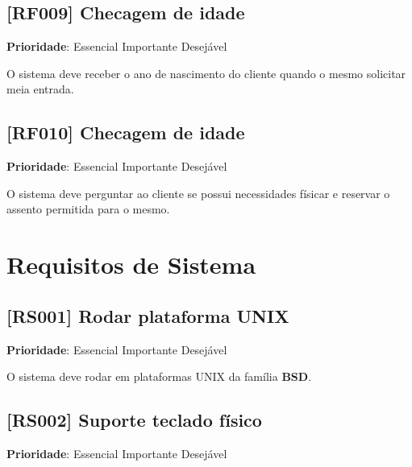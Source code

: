 \documentclass[12pt,a4paper]{article}
\let\oldsection\section
\renewcommand\section{\clearpage\oldsection}
\begin{document}
\subsection{[RF009] Checagem de idade}

\textbf{Prioridade}:
\mbox{\ooalign{$\checkmark$\cr\hidewidth$\square$\hidewidth\cr}} Essencial
\mbox{\ooalign{\cr\hidewidth$\square$\hidewidth\cr}} Importante
\mbox{\ooalign{\cr\hidewidth$\square$\hidewidth\cr}} Desejável

O sistema deve receber o ano de nascimento do cliente quando o mesmo
solicitar meia entrada.

\subsection{[RF010] Checagem de idade}

\textbf{Prioridade}:
\mbox{\ooalign{$\checkmark$\cr\hidewidth$\square$\hidewidth\cr}} Essencial
\mbox{\ooalign{\cr\hidewidth$\square$\hidewidth\cr}} Importante
\mbox{\ooalign{\cr\hidewidth$\square$\hidewidth\cr}} Desejável

O sistema deve perguntar ao cliente se possui necessidades físicar
e reservar o assento permitida para o mesmo.

\section{Requisitos de Sistema}

\subsection{[RS001] Rodar plataforma UNIX}

\textbf{Prioridade}:
\mbox{\ooalign{\cr\hidewidth$\square$\hidewidth\cr}} Essencial
\mbox{\ooalign{$\checkmark$\cr\hidewidth$\square$\hidewidth\cr}} Importante
\mbox{\ooalign{\cr\hidewidth$\square$\hidewidth\cr}} Desejável

O sistema deve rodar em plataformas UNIX da família \textbf{BSD}.

\subsection{[RS002] Suporte teclado físico}

\textbf{Prioridade}:
\mbox{\ooalign{$\checkmark$\cr\hidewidth$\square$\hidewidth\cr}} Essencial
\mbox{\ooalign{\cr\hidewidth$\square$\hidewidth\cr}} Importante
\mbox{\ooalign{\cr\hidewidth$\square$\hidewidth\cr}} Desejável
\end{document}
